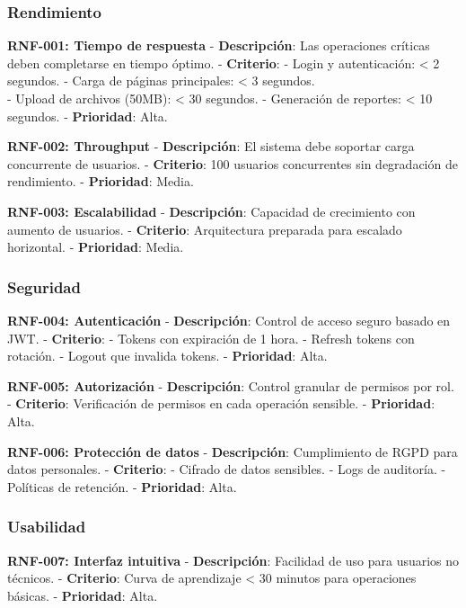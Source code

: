 \documentclass[12pt,a4paper,oneside]{report}
\begin{document}
\subsubsection{Rendimiento}\label{rendimiento}

\textbf{RNF-001: Tiempo de respuesta} - \textbf{Descripción}: Las
operaciones críticas deben completarse en tiempo óptimo. -
\textbf{Criterio}: - Login y autenticación: \textless{} 2 segundos. -
Carga de páginas principales: \textless{} 3 segundos.\\
- Upload de archivos (50MB): \textless{} 30 segundos. - Generación de
reportes: \textless{} 10 segundos. - \textbf{Prioridad}: Alta.

\textbf{RNF-002: Throughput} - \textbf{Descripción}: El sistema debe
soportar carga concurrente de usuarios. - \textbf{Criterio}: 100
usuarios concurrentes sin degradación de rendimiento. -
\textbf{Prioridad}: Media.

\textbf{RNF-003: Escalabilidad} - \textbf{Descripción}: Capacidad de
crecimiento con aumento de usuarios. - \textbf{Criterio}: Arquitectura
preparada para escalado horizontal. - \textbf{Prioridad}: Media.

\subsubsection{Seguridad}\label{seguridad}

\textbf{RNF-004: Autenticación} - \textbf{Descripción}: Control de
acceso seguro basado en JWT. - \textbf{Criterio}: - Tokens con
expiración de 1 hora. - Refresh tokens con rotación. - Logout que
invalida tokens. - \textbf{Prioridad}: Alta.

\textbf{RNF-005: Autorización} - \textbf{Descripción}: Control granular
de permisos por rol. - \textbf{Criterio}: Verificación de permisos en
cada operación sensible. - \textbf{Prioridad}: Alta.

\textbf{RNF-006: Protección de datos} - \textbf{Descripción}:
Cumplimiento de RGPD para datos personales. - \textbf{Criterio}: -
Cifrado de datos sensibles. - Logs de auditoría. - Políticas de
retención. - \textbf{Prioridad}: Alta.

\subsubsection{Usabilidad}\label{usabilidad}

\textbf{RNF-007: Interfaz intuitiva} - \textbf{Descripción}: Facilidad
de uso para usuarios no técnicos. - \textbf{Criterio}: Curva de
aprendizaje \textless{} 30 minutos para operaciones básicas. -
\textbf{Prioridad}: Alta.
\end{document}
